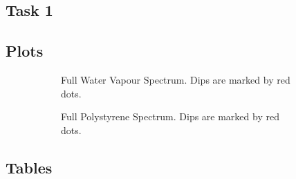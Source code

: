 \documentclass{article}
\begin{document}
\pagebreak{}

\begin{appendices}

\section{Task 1}
\label{app:task1}

\subsection{Plots}
\label{app:task1_plots}

\begin{figure}[h]
    \centering
    \begin{subfigure}[t]{0.48\textwidth}
        \centering
        \scalebox{0.5}{}
        \caption{Full Water Vapour Spectrum. Dips are marked by red dots.}
        \label{fig:water_vapour_full}
    \end{subfigure} \hfill
    \begin{subfigure}[t]{0.48\textwidth}
        \centering
        \scalebox{0.5}{}
        \caption{Full Polystyrene Spectrum. Dips are marked by red dots.}
        \label{fig:polystyrene_full}
    \end{subfigure}
	\caption{}
	\label{fig:water_polystyrene_full}
\end{figure}

\subsection{Tables}
\label{app:task1_tables}


\end{appendices}
\end{document}
